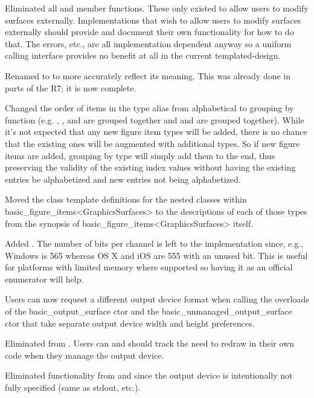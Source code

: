 \pnum
Eliminated all  and  member functions. These only existed to allow users to modify surfaces externally. Implementations that wish to allow users to modify surfaces externally should provide and document their own functionality for how to do that. The errors, etc., are all implementation dependent anyway so a uniform calling interface provides no benefit at all in the current templated-design.

\pnum
Renamed  to  to more accurately reflect its meaning. This was already done in parts of the R7; it is now complete.

\pnum
Changed the order of items in the  type alias from alphabetical to grouping by function (e.g. , , and  are grouped together and  and  are grouped together). While it's not expected that any new figure item types will be added, there is no chance that the existing ones will be augmented with additional types. So if new figure items are added, grouping by type will simply add them to the end, thus preserving the validity of the existing index values without having the existing entries be alphabetized and new entries not being alphabetized.

\pnum
Moved the class template definitions for the nested classes within basic_figure_items<GraphicsSurfaces> to the descriptions of each of those types from the synopsis of basic_figure_items<GraphicsSurfaces> itself.

\pnum
Added . The number of bits per channel is left to the implementation since, e.g., Windows\textregistered{} is 565 whereas OS X\textregistered{} and iOS\textregistered{} are 555 with an unused bit. This is useful for platforms with limited memory where supported so having it as an official enumerator will help. 

\pnum
Users can now request a different output device format when calling the overloads of the basic_output_surface ctor and the basic_unmanaged_output_surface ctor that take separate output device width and height preferences.

\pnum
Eliminated  from . Users can and should track the need to redraw in their own code when they manage the output device.

\pnum
Eliminated  functionality from  and  since the output device is intentionally not fully specified (same as stdout, etc.).

